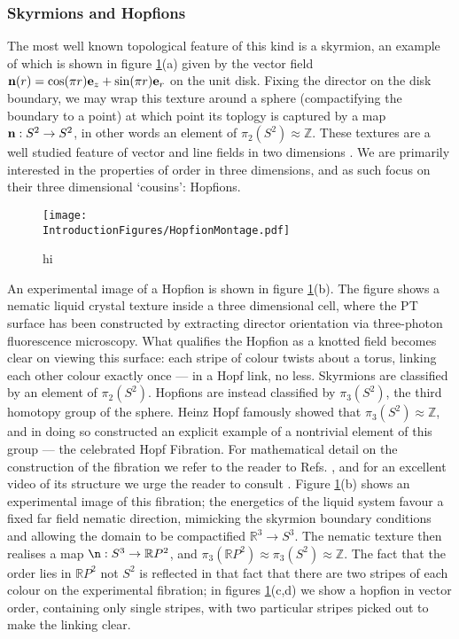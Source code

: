 \subsubsection{Skyrmions and Hopfions}
The most well known topological feature of this kind is a skyrmion, an example of which is shown in figure \ref{fig:HopfionMontage}(a) given by the vector field ${\bf n}(r) = \cos(\pi r) {\bf e}_z + \sin(\pi r) {\bf e}_r$ on the unit disk. Fixing the director on the disk boundary, we may wrap this texture around a sphere (compactifying the boundary to a point) at which point its toplogy is captured by a map ${\bf n} : S^2 \rightarrow S^2$, in other words an element of $\pi_2 (S^2)\approx \mathbb{Z}$. These textures are a well studied feature of vector and line fields in two dimensions \cite{GarethBook}. We are primarily interested in the properties of order in three dimensions, and as such focus on their three dimensional `cousins': Hopfions.
\begin{figure}[htbp]
\centering
\texttt{[image: \\IntroductionFigures/HopfionMontage.pdf]}
\caption{hi }
\label{fig:HopfionMontage}
\end{figure}
An experimental image of a Hopfion is shown in figure \ref{fig:HopfionMontage}(b)\cite{Chen}. The figure shows a nematic liquid crystal texture inside a three dimensional cell, where the PT surface has been constructed by extracting director orientation via three-photon fluorescence microscopy. What qualifies the Hopfion as a knotted field becomes clear on viewing this surface: each stripe of colour twists about a torus, linking each other colour exactly once --- in a Hopf link, no less. Skyrmions are classified by an element of $\pi_2(S^2)$. Hopfions are instead classified by $\pi_3(S^2)$, the third homotopy group of the sphere. Heinz Hopf famously showed that $\pi_3(S^2) \approx \mathbb{Z}$, and in doing so constructed an explicit example of a nontrivial element of this group --- the celebrated Hopf Fibration. For mathematical detail on the construction of the fibration we refer to the reader to Refs. \cite{GarethBook BottTu}, and for an excellent video of its structure we urge the reader to consult \cite{Niles}. Figure \ref{fig:HopfionMontage}(b) shows an experimental image of this fibration; the energetics of the liquid system favour a fixed far field nematic direction, mimicking the skyrmion boundary conditions and allowing the domain to be compactified $\mathbb{R}^3\rightarrow {S}^3$. The nematic texture then realises a map $\n: S^3 \rightarrow \mathbb{R}P^2$, and $\pi_3(\mathbb{R}P^2) \approx \pi_3(S^2) \approx \mathbb{Z}$. The fact that the order lies in $\mathbb{R}P^2$ not $S^2$ is reflected in that fact that there are two stripes of each colour on the experimental fibration\cite{Chen,Ackerman}; in figures \ref{fig:HopfionMontage}(c,d) we show a hopfion in vector order, containing only single stripes, with two particular stripes picked out to make the linking clear.
